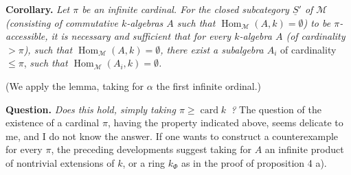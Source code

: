 \documentclass[11pt]{article}
\newcommand{\printedpage}[1]{\marginpar{\footnotesize p.~#1}}
\newcommand{\Hom}{\operatorname{Hom}}
\newcommand{\card}{\operatorname{card}}
\begin{document}
\printedpage{199}

\noindent\textbf{Corollary.} \textit{Let $\pi$ be an infinite cardinal. For the closed subcategory $\underline{S}'$ of $\mathcal{M}$ (consisting of commutative $k$-algebras $A$ such that $\Hom_{\mathcal{M}}(A,k)=\emptyset$) to be $\pi$-accessible, it is necessary and sufficient that for every $k$-algebra $A$ (of cardinality ${}>\pi$), such that $\Hom_{\mathcal{M}}(A,k)=\emptyset$, there exist a subalgebra $A_i$} of cardinality $\leqslant\pi$, \textit{such that $\Hom_{\mathcal{M}}(A_i,k)=\emptyset$.} %

\noindent(We apply the lemma, taking for $\alpha$ the first infinite ordinal.)

\noindent\textbf{Question.} \textit{Does this hold, simply taking $\pi\geqslant\card k$~?} The question of the existence of a cardinal $\pi$, having the property indicated above, seems delicate to me, and I do not know the answer. If one wants to construct a counterexample for every $\pi$, the preceding developments suggest taking for $A$ an infinite product of nontrivial extensions of $k$, or a ring $k_{\Phi}$ as in the proof of proposition 4 a).
\end{document}

